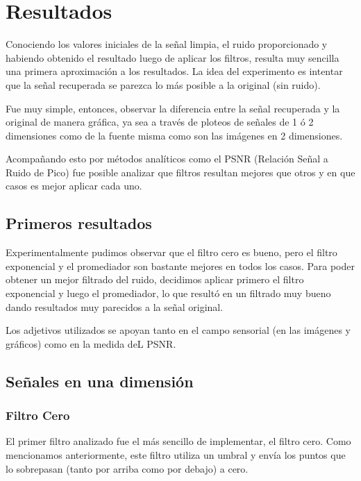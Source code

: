 \section{Resultados}

Conociendo los valores iniciales de la se\~nal limpia, el ruido proporcionado y
habiendo obtenido el resultado luego de aplicar los filtros, resulta muy
sencilla una primera aproximaci\'on a los resultados. La idea del experimento es
intentar que la se\~nal recuperada se parezca lo m\'as posible a la original
(sin ruido).

Fue muy simple, entonces, observar la diferencia entre la se\~nal recuperada y
la original de manera gr\'afica, ya sea a trav\'es de ploteos de se\~nales de 1
\'o 2 dimensiones como de la fuente misma como son las im\'agenes en 2
dimensiones.

Acompa\~nando esto por m\'etodos anal\'iticos como el PSNR (Relaci\'on Se\~nal a
Ruido de Pico) fue posible analizar que filtros resultan mejores que otros y en
que casos es mejor aplicar cada uno.

\subsection{Primeros resultados}

Experimentalmente pudimos observar que el filtro cero es bueno, pero el filtro 
exponencial y el promediador son bastante mejores en todos los casos. 
Para poder obtener un mejor filtrado del ruido, decidimos aplicar primero el 
filtro exponencial y luego el promediador, lo que result\'o en un filtrado muy 
bueno dando resultados muy parecidos a la se\~nal original. 

Los adjetivos utilizados se apoyan tanto en el campo sensorial (en las
im\'agenes y gr\'aficos) como en la medida deL PSNR. 

\subsection{Se\~nales en una dimensi\'on}

\subsubsection{Filtro Cero}

El primer filtro analizado fue el m\'as sencillo de implementar, el filtro cero.
Como mencionamos anteriormente, este filtro utiliza un umbral y env\'ia los
puntos que lo sobrepasan (tanto por arriba como por debajo) a cero.

